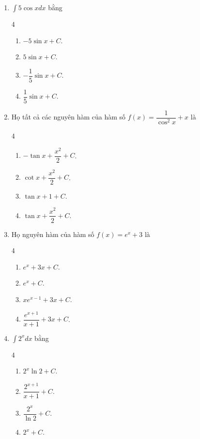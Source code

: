 \documentclass[12pt]{article}
\begin{document}
\begin{enumerate}[label=\textbf{Câu \arabic*.}]
		\item $\displaystyle \int 5\cos x dx$ bằng
		\begin{multicols}{4}
			\begin{enumerate}[label=\textbf{\Alph*.}]
				\item $-5\sin x + C$.
				\item $5\sin x + C$.
				\item $-\dfrac{1}{5}\sin x + C$.
				\item $\dfrac{1}{5}\sin x + C$.
			\end{enumerate}
		\end{multicols}
		
		\item Họ tất cả các nguyên hàm của hàm số $f(x) = \dfrac{1}{\cos^2 x} + x$ là
		\begin{multicols}{4}
			\begin{enumerate}[label=\textbf{\Alph*.}]
				\item $-\tan x + \dfrac{x^2}{2} + C$.
				\item $\cot x + \dfrac{x^2}{2} + C$.
				\item $\tan x + 1 + C$.
				\item $\tan x + \dfrac{x^2}{2} + C$.
			\end{enumerate}
		\end{multicols}
		
		\item Họ nguyên hàm của hàm số $f(x) = e^x + 3$ là
		\begin{multicols}{4}
			\begin{enumerate}[label=\textbf{\Alph*.}]
				\item $e^x + 3x + C$.
				\item $e^x + C$.
				\item $x e^{x-1} + 3x + C$.
				\item $\dfrac{e^{x+1}}{x+1} + 3x + C$.
			\end{enumerate}
		\end{multicols}
		
		\item $\displaystyle \int 2^x dx$ bằng
		\begin{multicols}{4}
			\begin{enumerate}[label=\textbf{\Alph*.}]
				\item $2^x \ln 2 + C$.
				\item $\dfrac{2^{x+1}}{x+1} + C$.
				\item $\dfrac{2^x}{\ln 2} + C$.
				\item $2^x + C$.
			\end{enumerate}
		\end{multicols}
		

\end{enumerate}
\end{document}
